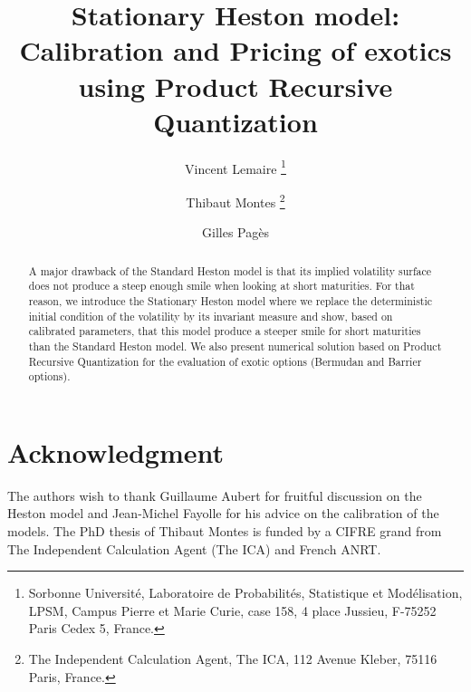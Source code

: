 \documentclass[11pt,a4paper]{article}
\begin{document}
\graphicspath{{graphics/}}


\title{Stationary Heston model: Calibration and Pricing of exotics using Product Recursive Quantization}
\author{
	\sc Vincent Lemaire
	\thanks{Sorbonne Université, Laboratoire de Probabilités, Statistique et Modélisation, LPSM, Campus Pierre et Marie Curie, case 158, 4 place Jussieu, F-75252 Paris Cedex 5, France.}
	\and
	\sc Thibaut Montes
	\samethanks[1]
	\thanks{The Independent Calculation Agent, The ICA, 112 Avenue Kleber, 75116 Paris, France.}
	\and
	\sc Gilles Pagès
	\samethanks[1]
}
\maketitle



\begin{abstract}
	A major drawback of the Standard Heston model is that its implied volatility surface does not produce a steep enough smile when looking at short maturities. For that reason, we introduce the Stationary Heston model where we replace the deterministic initial condition of the volatility by its invariant measure and show, based on calibrated parameters, that this model produce a steeper smile for short maturities than the Standard Heston model. We also present numerical solution based on Product Recursive Quantization for the evaluation of exotic options (Bermudan and Barrier options).
\end{abstract}





\section*{Acknowledgment}
The authors wish to thank Guillaume Aubert for fruitful discussion on the Heston model and Jean-Michel Fayolle for his advice on the calibration of the models. The PhD thesis of Thibaut Montes is funded by a CIFRE grand from The Independent Calculation Agent (The ICA) and French ANRT.
\end{document}
